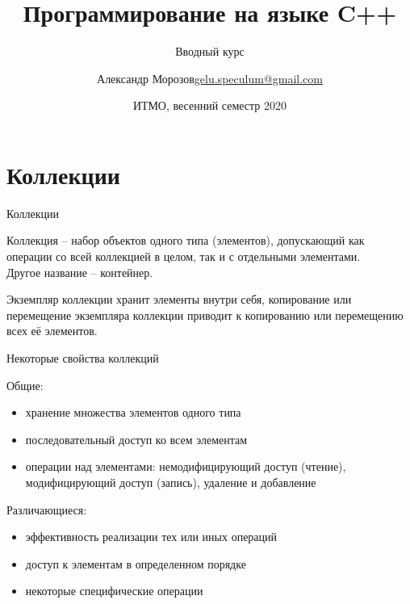 \documentclass[unknownkeysallowed,xcolor=table]{beamer}
\title[C++]
{Программирование на языке C++}
\subtitle{Вводный курс}
\author[А.~Б.~Морозов]
{
  \texorpdfstring{Александр Морозов\newline\href{mailto:gelu.speculum@gmail.com}{gelu.speculum@gmail.com}}
  {Александр Морозов}
}
\date[ITMO 2020]
{ИТМО, весенний семестр 2020}
\begin{document}
\frame{\titlepage}


\section{Коллекции}

\begin{frame}{Коллекции}

Коллекция -- набор объектов одного типа (элементов), допускающий как операции со всей коллекцией в целом, так и с отдельными элементами. \\
Другое название -- контейнер.

\vspace{2em}

Экземпляр коллекции хранит элементы внутри себя, копирование или перемещение экземпляра коллекции приводит к копированию или перемещению всех её элементов.

\end{frame}

\begin{frame}{Некоторые свойства коллекций}

Общие:

\vspace{0.5em}

\begin{itemize}
  \item хранение множества элементов одного типа \vspace{0.5em}
  \item последовательный доступ ко всем элементам \vspace{0.5em}
  \item операции над элементами: немодифицирующий доступ (чтение), модифицирующий доступ (запись), удаление и добавление
\end{itemize}

\vspace{1em}

Различающиеся:

\vspace{0.5em}

\begin{itemize}
  \item эффективность реализации тех или иных операций \vspace{0.5em}
  \item доступ к элементам в определенном порядке \vspace{0.5em}
  \item некоторые специфические операции
\end{itemize}

\end{frame}
\end{document}

